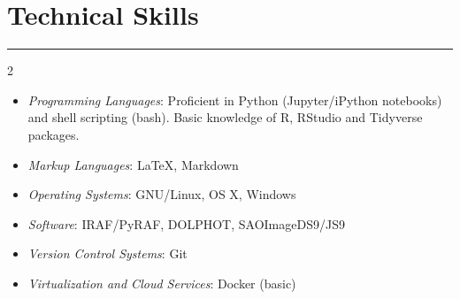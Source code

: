 \documentclass[letterpaper,10pt]{article}
\begin{document}
\section*{Technical Skills}
\hrule
\vspace{.3 cm}
    \begin{multicols}{2}




\begin{itemize}[label=$\blacktriangleright$]
	\item \emph{Programming Languages}: Proficient in Python (Jupyter/iPython notebooks) and shell scripting (bash). Basic knowledge of R, RStudio and Tidyverse packages. 
\end{itemize}

  \begin{itemize}[label=$\blacktriangleright$]
        \item \emph{Markup Languages}: \LaTeX, Markdown
  \end{itemize}

  \begin{itemize}[label=$\blacktriangleright$]
  \item \emph{Operating Systems}: GNU/Linux, OS X, Windows
    \end{itemize}

  \begin{itemize}[label=$\blacktriangleright$]
          \item \emph{Software}: IRAF/PyRAF, DOLPHOT, SAOImageDS9/JS9
    \end{itemize}

  \begin{itemize}[label=$\blacktriangleright$]
          \item \emph{Version Control Systems}: Git
    \end{itemize}
  
    \begin{itemize}[label=$\blacktriangleright$]
            \item \emph{Virtualization and Cloud Services}: Docker (basic)
    \end{itemize}
    
    
        \end{multicols}
\end{document}
